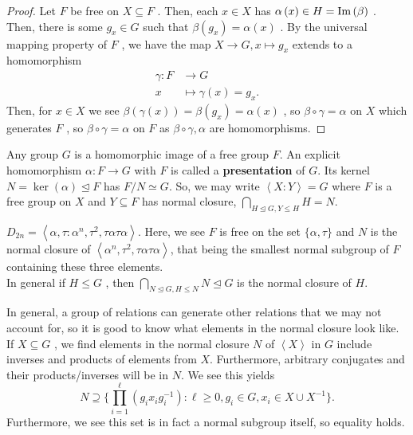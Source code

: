 \begin{proof}
	Let \(F\)  be free on \( X \subseteq F\) . Then, each \(x \in X\)  has \(\alpha\left( x \right) \in H = \operatorname{Im}\left( \beta \right) \) . Then, there is some \(g_{x} \in G\)  such that \(\beta\left( g_{x} \right) = \alpha\left( x \right)  \) . By the universal mapping property of \(F\) , we have the map \(X \to G, x \mapsto g_{x}\) extends to a homomorphism \begin{align*}
		\gamma: F &\longrightarrow G \\
		x &\longmapsto \gamma(x) = g_{x}
	.\end{align*}
	Then, for \(x \in X\) we see \(\beta\left( \gamma\left( x \right)  \right)  = \beta\left( g_{x} \right) = \alpha\left( x \right)  \)  , so \(\beta \circ \gamma = \alpha\)  on \(X\)  which generates \(F\) , so \(\beta \circ \gamma = \alpha\)  on \(F\)  as \(\beta \circ \gamma, \alpha\)  are homomorphisms.
\end{proof}
\begin{definition}
	Any group \(G\) is a homomorphic image of a free group \(F\). An explicit homomorphism \(\alpha: F \to G\)  with \(F\) is called a \textbf{presentation} of \(G\). Its kernel \(N = \ker \left( \alpha \right)  \trianglelefteq F\)  has \(F / N \simeq G\). So, we may write \(\left<X : Y \right>  = G\)  where \(F\)  is a free group on \(X\)  and \(Y \subseteq F\) has normal closure, \(\bigcap_{H \trianglelefteq G, Y \le H} H = N \).
\end{definition}
\begin{example}
	\(D_{2n} = \left<\alpha, \tau : \alpha ^{n}, \tau^2, \tau \alpha\tau \alpha\right>  \). Here, we see \(F\)  is free on the set \(\{\alpha, \tau\} \)  and \(N\)  is the normal closure of \(\left<\alpha ^{n}, \tau ^2, \tau \alpha \tau \alpha \right> \), that being the smallest normal subgroup of \(F\)  containing these three elements.\\
	In general if \(H \le G\) , then \(\bigcap_{N \trianglelefteq G, H \le N} N \trianglelefteq G \) is the normal closure of \(H\).
\end{example}
\begin{remark}
	In general, a group of relations can generate other relations that we may not account for, so it is good to know what elements in the normal closure look like. If \(X \subseteq G\) , we find elements in the normal closure \(N\) of \(\left<X \right> \) in \(G\) include inverses and products of elements from \(X\). Furthermore, arbitrary conjugates and their products/inverses will be in \(N\). We see this yields \[
		N \supseteq \{\prod_{i= 1}^{\ell} \left( g_{i} x_{i} g_{i}^{-1} \right)  : \ell \ge 0, g_{i} \in G, x_{i} \in X \cup X^{-1}\}
	.\]
Furthermore, we see this set is in fact a normal subgroup itself, so equality holds.
\end{remark}
